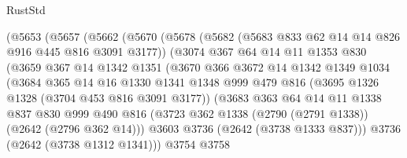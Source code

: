 \begin{lexlean}{RustStd}
\begin{coremodule}
                    (@5653
                      (@5657
                        (@5662
                          (@5670
                            (@5678
                              (@5682 (@5683 @833 @62 @14 @14 @826 @916 @445 @816 @3091 @3177))
                              (@3074
                                @367
                                @64
                                @14
                                @11
                                @1353
                                @830
                                (@3659
                                  @367
                                  @14
                                  @1342
                                  @1351
                                  (@3670
                                    @366
                                    @3672
                                    @14
                                    @1342
                                    @1349
                                    @1034
                                    (@3684
                                      @365
                                      @14
                                      @16
                                      @1330
                                      @1341
                                      @1348
                                      @999
                                      @479
                                      @816
                                      (@3695 @1326 @1328 (@3704 @453 @816 @3091 @3177))
                                      (@3683
                                        @363
                                        @64
                                        @14
                                        @11
                                        @1338
                                        @837
                                        @830
                                        @999
                                        @490
                                        @816
                                        (@3723
                                          @362
                                          @1338
                                          (@2790 (@2791 @1338))
                                          (@2642 (@2796 @362 @14)))
                                        @3603
                                        @3736
                                        (@2642 (@3738 @1333 @837)))
                                      @3736
                                      (@2642 (@3738 @1312 @1341)))
                                    @3754
                                    @3758

\end{coremodule}
\end{lexlean}
